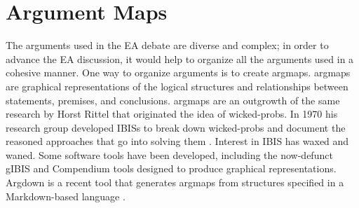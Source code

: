 \propsend




\section{Argument Maps}
\label{sec-arg-maps-intro}

The arguments used in the \ac{EA} debate are diverse and complex; in order to advance the \ac{EA} discussion, it would
help to organize all the arguments used in a cohesive manner. One way to organize arguments is to create \acp{argmap}.
\Acp{argmap} are graphical representations of the logical structures and relationships between statements, premises, and
conclusions. \Acp{argmap} are an outgrowth of the same research by Horst Rittel that originated the idea of
\acp{wicked-prob}. In 1970 his research group developed \acp{IBIS} to break down \acp{wicked-prob} and document the
reasoned approaches that go into solving them \cite{kunz_issues_1970}. Interest in \ac{IBIS} has waxed and waned. Some
software tools have been developed, including the now-defunct gIBIS \cite{conklin_gibis_1988} and Compendium
\cite{dutoit_hypermedia_2006} tools designed to produce graphical representations. Argdown is a recent tool that
generates \acp{argmap} from structures specified in a Markdown-based language \cite{voigt_argdown_2018}.

